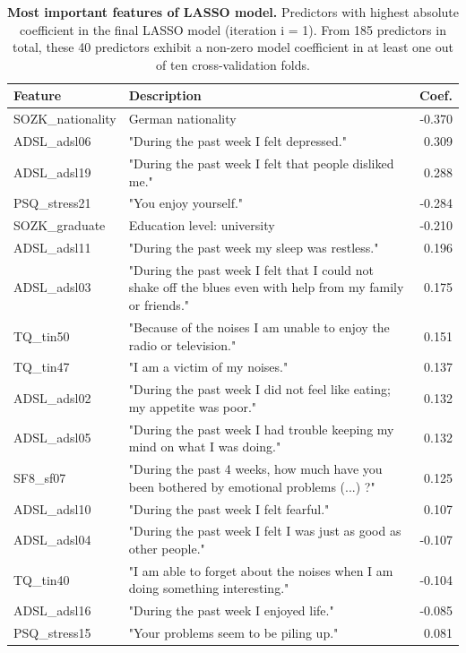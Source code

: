 \documentclass[
  oneside]{book}
\begin{document}
\begin{table}

\caption{\label{tab:09-lasso-depression-tab}\textbf{Most important features of LASSO model.} Predictors with highest absolute coefficient in the final LASSO model (iteration i = 1). From 185 predictors in total, these 40 predictors exhibit a non-zero model coefficient in at least one out of ten cross-validation folds.}
\centering
\begin{tabular}[t]{l>{\raggedright\arraybackslash}p{10cm}r}
\toprule
\textbf{Feature} & \textbf{Description} & \textbf{Coef.}\\
\midrule
SOZK\_nationality & German nationality & -0.370\\
ADSL\_adsl06 & "During the past week I felt depressed." & 0.309\\
ADSL\_adsl19 & "During the past week I felt that people disliked me." & 0.288\\
PSQ\_stress21 & "You enjoy yourself." & -0.284\\
SOZK\_graduate & Education level: university & -0.210\\
ADSL\_adsl11 & "During the past week my sleep was restless." & 0.196\\
ADSL\_adsl03 & "During the past week I felt that I could not shake off the blues even with help from my family or friends." & 0.175\\
TQ\_tin50 & "Because of the noises I am unable to enjoy the radio or television." & 0.151\\
TQ\_tin47 & "I am a victim of my noises." & 0.137\\
ADSL\_adsl02 & "During the past week I did not feel like eating; my appetite was poor." & 0.132\\
ADSL\_adsl05 & "During the past week I had trouble keeping my mind on what I was doing." & 0.132\\
SF8\_sf07 & "During the past 4 weeks, how much have you been bothered by emotional problems (...) ?" & 0.125\\
ADSL\_adsl10 & "During the past week I felt fearful." & 0.107\\
ADSL\_adsl04 & "During the past week I felt I was just as good as other people." & -0.107\\
TQ\_tin40 & "I am able to forget about the noises when I am doing something interesting." & -0.104\\
ADSL\_adsl16 & "During the past week I enjoyed life." & -0.085\\
PSQ\_stress15 & "Your problems seem to be piling up." & 0.081\\

\end{tabular}
\end{table}
\end{document}
